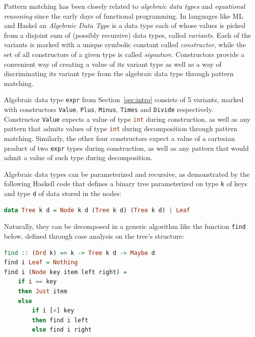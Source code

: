\documentclass[preprint]{sigplanconf}
\makeatletter
\DeclareRobustCommand{\code}[1]{{\lstinline[breaklines=false,escapechar=@]{#1}}}
\DeclareRobustCommand{\codehaskell}[1]{{\lstinline[breaklines=false,language=Haskell]{#1}}}
\DeclareRobustCommand{\codeocaml}[1]{{\lstinline[breaklines=false,language=Caml]{#1}}}
\makeatother
\begin{document}


Pattern matching has been closely related to \emph{algebraic data types} and 
\emph{equational reasoning} since the early days of functional programming.
In languages like ML and Haskel an \emph{Algebraic Data Type} is a data type 
each of whose values is picked from a disjoint sum of (possibly recursive) data 
types, called \emph{variants}. Each of the variants is marked with a unique 
symbolic constant called \emph{constructor}, while the set of all constructors 
of a given type is called \emph{signature}. Constructors provide a convenient 
way of creating a value of its variant type as well as a way of discriminating 
its variant type from the algebraic data type through pattern matching.

Algebraic data type \codeocaml{expr} from Section~\ref{sec:intro} consists of 5 
variants, marked with constructors \codeocaml{Value}, \codeocaml{Plus}, 
\codeocaml{Minus}, \codeocaml{Times} and \codeocaml{Divide} respectively. 
Constructor \codeocaml{Value} expects a value of type \codeocaml{int} during 
construction, as well as any pattern that admits values of type \codeocaml{int} 
during decomposition through pattern matching. Similarly, the other four 
constructors expect a value of a cartesian product of two \codeocaml{expr} 
types during construction, as well as any pattern that would admit a value of 
such type during decomposition.

Algebraic data types can be parameterized and recursive, as demonstrated by the 
following Haskell code that defines a binary tree parameterized on type 
\codehaskell{k} of keys and type \codehaskell{d} of data stored in the nodes:

\begin{lstlisting}[language=Haskell]
data Tree k d = Node k d (Tree k d) (Tree k d) | Leaf
\end{lstlisting}

Naturally, they can be decomposed in a generic algorithm like the function 
\code{find} below, defined through case analysis on the tree's structure:

\begin{lstlisting}[language=Haskell]
find :: (Ord k) => k -> Tree k d -> Maybe d
find i Leaf = Nothing
find i (Node key item left right) = 
    if i == key 
    then Just item 
    else 
        if i [<] key 
        then find i left 
        else find i right
\end{lstlisting}
\end{document}
